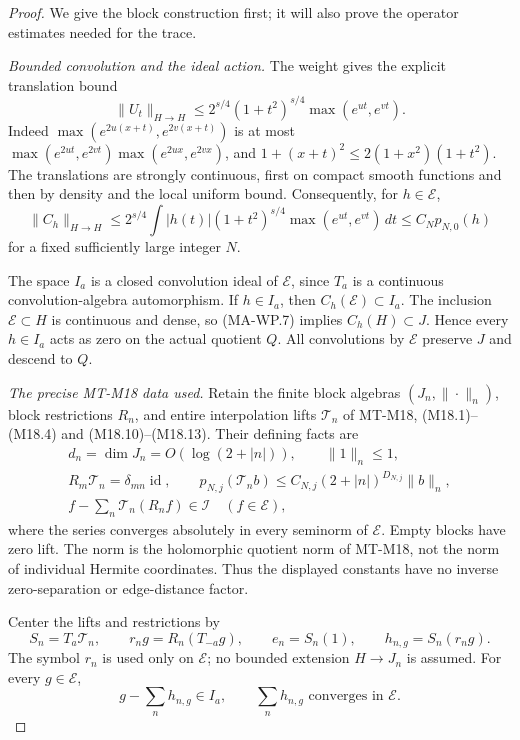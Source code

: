 \begin{proof}
We give the block construction first; it will also prove the
operator estimates needed for the trace.

\emph{Bounded convolution and the ideal action.}
The weight gives the explicit translation bound
\[
 \|U_t\|_{H\to H}
 \le 2^{s/4}(1+t^2)^{s/4}\max(e^{ut},e^{vt}).
 \tag{MA-WP.6}
\]
Indeed $\max(e^{2u(x+t)},e^{2v(x+t)})$ is at most
$\max(e^{2ut},e^{2vt})\max(e^{2ux},e^{2vx})$, and
$1+(x+t)^2\le2(1+x^2)(1+t^2)$.
The translations are strongly continuous, first on compact smooth
functions and then by density and the local uniform bound.
Consequently, for $h\in\mathcal E$,
\[
 \|C_h\|_{H\to H}
 \le 2^{s/4}\int |h(t)|(1+t^2)^{s/4}
                         \max(e^{ut},e^{vt})\,dt
 \le C_N p_{N,0}(h)
 \tag{MA-WP.7}
\]
for a fixed sufficiently large integer $N$.

The space $I_a$ is a closed convolution ideal of $\mathcal E$,
since $T_a$ is a continuous convolution-algebra automorphism.
If $h\in I_a$, then $C_h(\mathcal E)\subset I_a$.
The inclusion $\mathcal E\subset H$ is continuous and dense,
so (MA-WP.7) implies $C_h(H)\subset J$. Hence every
$h\in I_a$ acts as zero on the actual quotient $Q$.
All convolutions by $\mathcal E$ preserve $J$ and descend to $Q$.

\emph{The precise MT-M18 data used.}
Retain the finite block algebras $(J_n,\|\cdot\|_n)$, block
restrictions $R_n$, and entire interpolation lifts $\mathcal T_n$
of MT-M18, (M18.1)--(M18.4) and (M18.10)--(M18.13).
Their defining facts are
\[
 \begin{gathered}
 d_n=\dim J_n=O(\log(2+|n|)),\qquad \|1\|_n\le1,\\
 R_m\mathcal T_n=\delta_{mn}\operatorname{id},\qquad
 p_{N,j}(\mathcal T_n b)
       \le C_{N,j}(2+|n|)^{D_{N,j}}\|b\|_n,\\
 f-\sum_n\mathcal T_n(R_nf)\in\mathcal I
             \quad(f\in\mathcal E),
 \end{gathered}
 \tag{MA-WP.8}
\]
where the series converges absolutely in every seminorm of
$\mathcal E$. Empty blocks have zero lift. The norm is the
holomorphic quotient norm of MT-M18, not the norm of individual
Hermite coordinates. Thus the displayed constants have no
inverse zero-separation or edge-distance factor.

Center the lifts and restrictions by
\[
 S_n=T_a\mathcal T_n,
 \qquad r_ng=R_n(T_{-a}g),
 \qquad e_n=S_n(1),
 \qquad h_{n,g}=S_n(r_ng).
 \tag{MA-WP.9}
\]
The symbol $r_n$ is used only on $\mathcal E$; no bounded
extension $H\to J_n$ is assumed. For every $g\in\mathcal E$,
\[
 g-\sum_n h_{n,g}\in I_a,
 \qquad \sum_n h_{n,g}\text{ converges in }\mathcal E.
 \tag{MA-WP.10}
\]


\end{proof}
